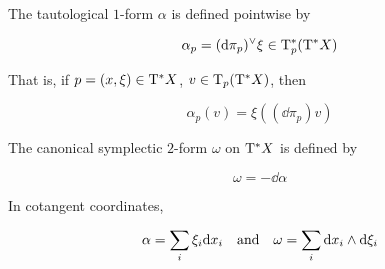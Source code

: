 \begin{definition}
     The tautological \(1\)-form \(\alpha\) is defined pointwise by

    \[\alpha_p = (\dd \pi_p)^\vee\xi \in \mathrm{T}_p^*(\mathrm{T}^* X)\]

    That is, if \(p = (x, \xi) \in \mathrm{T}^*X\), \(v \in \mathrm{T}_p(\mathrm{T}^*X)\), then

    \[\alpha_p(v) = \xi((\dd\pi_p)v)\]
\end{definition}

\begin{definition}
     The canonical symplectic \(2\)-form \(\omega\) on \(\mathrm{T}^*X\) is defined by

    \[\omega = -\dd\alpha\]
\end{definition}

\begin{lemma}
    In cotangent coordinates,

    \[\alpha = \sum_i \xi_i \dd x_i \qqtext{and}\omega = \sum_i \dd x_i \wedge \dd \xi_i\]
\end{lemma}
